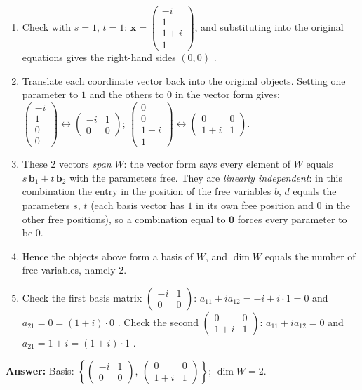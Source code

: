 \documentclass[11pt]{article}
\begin{document}
\begin{tcolorbox}[breakable,colback=ans,colframe=ansb,boxrule=0.5pt,left=4pt,right=4pt,top=2pt,bottom=2pt]
\begin{enumerate}[leftmargin=3.1em,itemsep=1pt,topsep=1pt,label=\textbf{Step \arabic*.}]
\item Check with $s=1$, $t=1$: $\mathbf x=\begin{pmatrix}-i\\1\\1+i\\1\end{pmatrix}$, and substituting into the original equations gives the right-hand sides $(0,0)$ \checkmark.
\item Translate each coordinate vector back into the original objects. Setting one parameter to $1$ and the others to $0$ in the vector form gives: $\begin{pmatrix}-i\\1\\0\\0\end{pmatrix}\leftrightarrow \begin{pmatrix}-i & 1 \\ 0 & 0\end{pmatrix}$; $\begin{pmatrix}0\\0\\1+i\\1\end{pmatrix}\leftrightarrow \begin{pmatrix}0 & 0 \\ 1+i & 1\end{pmatrix}$.
\item These 2 vectors \emph{span} $W$: the vector form says every element of $W$ equals $s\,\mathbf b_1+t\,\mathbf b_2$ with the parameters free. They are \emph{linearly independent}: in this combination the entry in the position of the free variables $b$, $d$ equals the parameters $s$, $t$ (each basis vector has $1$ in its own free position and $0$ in the other free positions), so a combination equal to $\mathbf 0$ forces every parameter to be $0$.
\item Hence the objects above form a basis of $W$, and $\dim W$ equals the number of free variables, namely $2$.
\item Check the first basis matrix $\begin{pmatrix}-i&1\\0&0\end{pmatrix}$: $a_{11}+ia_{12}=-i+i\cdot1=0$ \checkmark and $a_{21}=0=(1+i)\cdot0$ \checkmark. Check the second $\begin{pmatrix}0&0\\1+i&1\end{pmatrix}$: $a_{11}+ia_{12}=0$ \checkmark and $a_{21}=1+i=(1+i)\cdot1$ \checkmark.
\end{enumerate}\textbf{Answer:} Basis: $\left\{\begin{pmatrix}-i & 1 \\ 0 & 0\end{pmatrix},\ \begin{pmatrix}0 & 0 \\ 1+i & 1\end{pmatrix}\right\}$; $\dim W=2$.\end{tcolorbox}
\end{document}
